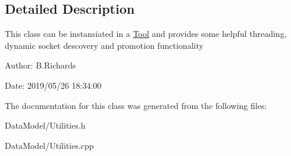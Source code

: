 \subsection{Detailed Description}
This class can be instansiated in a \hyperlink{classTool}{Tool} and provides some helpful threading, dynamic socket descovery and promotion functionality

\begin{DoxyParagraph}{Author\-:}
B.\-Richards 
\end{DoxyParagraph}
\begin{DoxyParagraph}{Date\-:}
2019/05/26 18\-:34\-:00 
\end{DoxyParagraph}


The documentation for this class was generated from the following files\-:\begin{DoxyCompactItemize}
\item 
Data\-Model/Utilities.\-h\item 
Data\-Model/Utilities.\-cpp\end{DoxyCompactItemize}
